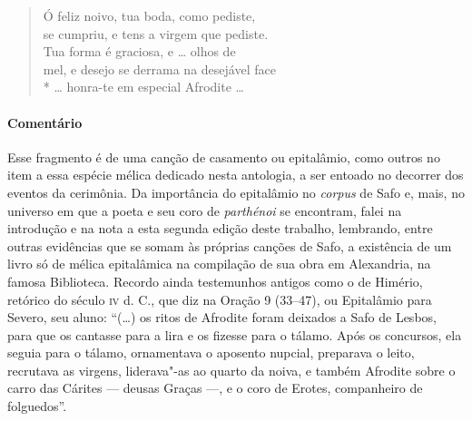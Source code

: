 \begin{verse}
Ó feliz noivo, tua boda, como pediste,\\
se cumpriu, e tens a virgem que pediste.\\
Tua forma é graciosa, e \ldots{} olhos de\\
mel, e desejo se derrama na desejável face\\*
\ldots{} honra-te em especial Afrodite \ldots{}
\end{verse}

\paragraph{Comentário} Esse fragmento é de uma canção de casamento ou epitalâmio, como outros no item a essa espécie mélica dedicado nesta antologia, a ser entoado no decorrer dos eventos da cerimônia.
Da importância do epitalâmio no \textit{corpus} de Safo e, mais, no universo em que a poeta e seu coro de \textit{parthénoi} se encontram, falei na introdução e na nota a esta segunda edição deste trabalho, lembrando, entre outras evidências que se somam às próprias canções de Safo, a existência de um livro só de mélica epitalâmica na compilação de sua obra  em Alexandria, na famosa Biblioteca. Recordo ainda testemunhos antigos como o de Himério, retórico do século \textsc{iv} d. C., que diz na Oração 9 (33--47), ou Epitalâmio para Severo, seu aluno: ``(\ldots{}) os ritos de Afrodite foram deixados a Safo de Lesbos, para que os cantasse para a lira e os fizesse para o tálamo. Após os concursos, ela seguia para o tálamo, ornamentava o aposento nupcial, preparava o leito, recrutava as virgens, liderava"-as ao quarto da noiva, e também Afrodite sobre o carro das Cárites --- deusas Graças ---, e o coro de Erotes, companheiro de folguedos''.

